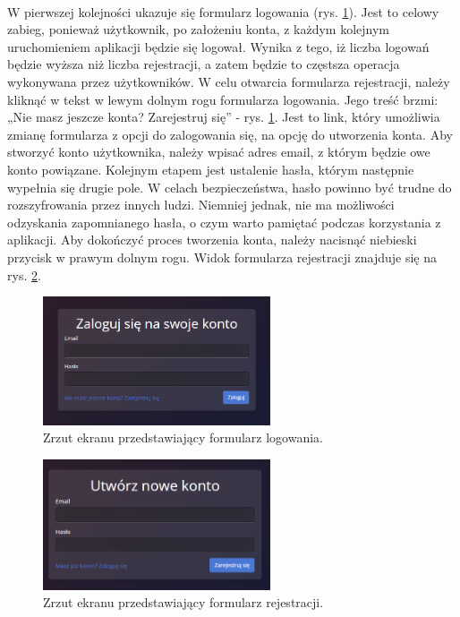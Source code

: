 \paragraph{}
W pierwszej kolejności ukazuje się formularz logowania (rys. \ref{fig:login_form}). Jest to celowy zabieg, ponieważ użytkownik, po założeniu konta, z każdym kolejnym uruchomieniem aplikacji będzie się logował. Wynika z tego, iż liczba logowań będzie wyższa niż liczba rejestracji, a zatem będzie to częstsza operacja wykonywana przez użytkowników. W celu otwarcia formularza rejestracji, należy kliknąć w tekst w lewym dolnym rogu formularza logowania. Jego treść brzmi: „Nie masz jeszcze konta? Zarejestruj się” - rys. \ref{fig:login_form}. Jest to link, który umożliwia zmianę formularza z opcji do zalogowania się, na opcję do utworzenia konta. Aby stworzyć konto użytkownika, należy wpisać adres email, z którym będzie owe konto powiązane. Kolejnym etapem jest ustalenie hasła, którym następnie wypełnia się drugie pole. W celach bezpieczeństwa, hasło powinno być trudne do rozszyfrowania przez innych ludzi. Niemniej jednak, nie ma możliwości odzyskania zapomnianego hasła, o czym warto pamiętać podczas korzystania z aplikacji. Aby dokończyć proces tworzenia konta, należy nacisnąć niebieski przycisk w prawym dolnym rogu. Widok formularza rejestracji znajduje się na rys. \ref{fig:register_form}.

\begin{figure}
	\centering
	\includegraphics[width=0.6\textwidth]{./graf/login_form.png}
	\caption{Zrzut ekranu przedstawiający formularz logowania.}
	\label{fig:login_form}
\end{figure}

\begin{figure}
	\centering
	\includegraphics[width=0.6\textwidth]{./graf/register_form.png}
	\caption{Zrzut ekranu przedstawiający formularz rejestracji.}
	\label{fig:register_form}
\end{figure}

